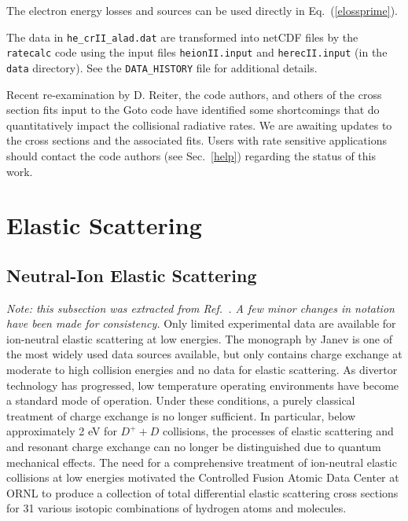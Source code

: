 \documentclass[12pt]{report}
\begin{document}
The electron energy losses and sources can be used directly
in Eq.~(\ref{elossprime}).

The data in \verb+he_crII_alad.dat+ are transformed into netCDF files
by the {\tt ratecalc} code using the input files
\verb+heionII.input+ and \verb+herecII.input+ (in the {\tt data} directory).
See the \verb+DATA_HISTORY+ file for additional details.

Recent re-examination by D. Reiter, the code authors, 
and others of the cross section fits input to the Goto code have
identified some shortcomings that do quantitatively impact the 
collisional radiative rates.  We are awaiting updates to the
cross sections and the associated fits.  Users with rate
sensitive applications should contact the code authors 
(see Sec.~\ref{help}) regarding the status of this work.

\section{Elastic Scattering}
\label{ElasticScattering}

\subsection{Neutral-Ion Elastic Scattering}
\label{NeutralIon}

{\em Note: this subsection was extracted from Ref.~\cite{Kanz00}. 
A few minor changes in notation have been made for consistency.}
Only limited experimental data are available for ion-neutral elastic
scattering at low energies.  The monograph by Janev\cite{Jane87} is one of the
most widely used data sources available, but only contains charge
exchange at moderate to high collision energies and no data for
elastic scattering.  As divertor technology has progressed, low
temperature operating environments have become a standard mode of
operation.  Under these conditions, a purely classical treatment
of charge exchange is no longer sufficient. 
In particular, below
approximately 2 eV for $D^{+} + D$ collisions, the processes
of elastic scattering and and resonant charge exchange can no longer
be
distinguished
due to quantum mechanical effects.  The need for a
comprehensive treatment of ion-neutral elastic collisions at low
energies motivated the Controlled Fusion Atomic Data Center at
ORNL to produce a collection of total differential elastic scattering
cross sections for 31 various isotopic combinations of hydrogen atoms
and molecules\cite{Krst98}.
\end{document}
